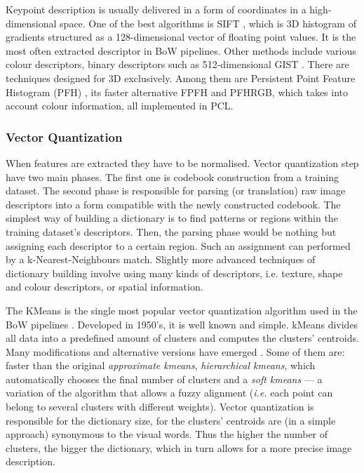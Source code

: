 		Keypoint description is usually delivered in a form of coordinates in a high-dimensional space. One of the best algorithms is SIFT \cite{sift_features}, which is 3D histogram of gradients structured as a 128-dimensional vector of floating point values. It is the most often extracted descriptor in BoW pipelines. Other methods include various colour descriptors, binary descriptors such as 512-dimensional GIST \cite{ponce2011cv}. There are techniques designed for 3D exclusively. Among them are Persistent Point Feature Histogram (PFH) \cite{pfh_rusu2008}, its faster alternative FPFH \cite{fpfh_rusu2009} and PFHRGB, which takes into account colour information, all implemented in PCL.
		
		\subsubsection{Vector Quantization}
		When features are extracted they have to be normalised. Vector quantization step have two main phases. The first one is codebook construction from a training dataset. The second phase is responsible for parsing (or translation) raw image descriptors into a form compatible with the newly constructed codebook. The simplest way of building a dictionary is to find patterns or regions within the training dataset's descriptors. Then, the parsing phase would be nothing but assigning each descriptor to a certain region. Such an assignment can performed by a k-Nearest-Neighbours match. Slightly more advanced techniques of dictionary building involve using many kinds of descriptors, i.e. texture, shape and colour descriptors, or spatial information.	
		
		The KMeans is the single most popular vector quantization algorithm used in the BoW pipelines \cite{tsai2012bag}. Developed in 1950's, it is well known and simple. kMeans divides all data into a predefined amount of clusters and computes the clusters' centroids. Many modifications and alternative versions have emerged \cite{kmeans_jain2010data}. Some of them are: faster than the original \emph{approximate kmeans}, \emph{hierarchical kmeans}, which automatically chooses the final number of clusters and a  \emph{soft kmeans} --- a variation of the algorithm that allows a fuzzy alignment (\textit{i.e.} each point can belong to several clusters with different weights). Vector quantization is responsible for the dictionary size, for the clusters' centroids are (in a simple approach) synonymous to the visual words. Thus the higher the number of clusters, the bigger the dictionary, which in turn allows for a more precise image description.
		
